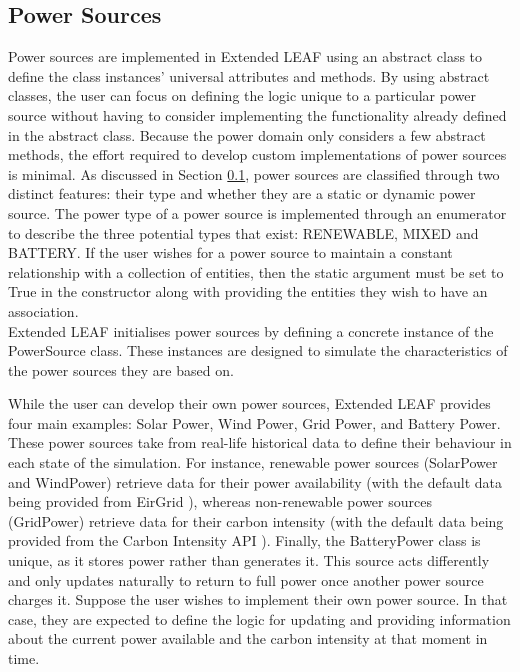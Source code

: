 \documentclass{l4proj}
\begin{document}
\subsection{Power Sources}\label{sec:power-sources}
Power sources are implemented in Extended LEAF using an abstract class to define the class instances' universal attributes and methods.
By using abstract classes, the user can focus on defining the logic unique to a particular power source without having to consider implementing the functionality already defined in the abstract class.
Because the power domain only considers a few abstract methods, the effort required to develop custom implementations of power sources is minimal.
As discussed in Section \ref{sec:power-sources}, power sources are classified through two distinct features: their type and whether they are a static or dynamic power source.
The power type of a power source is implemented through an enumerator to describe the three potential types that exist: RENEWABLE, MIXED and BATTERY.
If the user wishes for a power source to maintain a constant relationship with a collection of entities, then the static argument must be set to True in the constructor along with providing the entities they wish to have an association.\\
Extended LEAF initialises power sources by defining a concrete instance of the PowerSource class.
These instances are designed to simulate the characteristics of the power sources they are based on.

While the user can develop their own power sources, Extended LEAF provides four main examples: Solar Power, Wind Power, Grid Power, and Battery Power.
These power sources take from real-life historical data to define their behaviour in each state of the simulation.
For instance, renewable power sources (SolarPower and WindPower) retrieve data for their power availability (with the default data being provided from EirGrid \citep{eirgrid}), whereas non-renewable power sources (GridPower) retrieve data for their carbon intensity (with the default data being provided from the Carbon Intensity API \citep{carbon_intensity_api}).
Finally, the BatteryPower class is unique, as it stores power rather than generates it.
This source acts differently and only updates naturally to return to full power once another power source charges it.
Suppose the user wishes to implement their own power source.
In that case, they are expected to define the logic for updating and providing information about the current power available and the carbon intensity at that moment in time.
\end{document}
